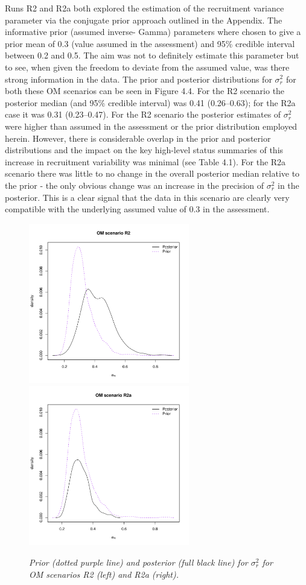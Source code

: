 \documentclass[11pt]{article}
\newcommand{\sigr}{\sigma^2_r}
\begin{document}
Runs R2 and R2a both explored the estimation of the recruitment variance parameter via the
conjugate prior approach outlined in the Appendix. The informative prior (assumed inverse-
Gamma) parameters where chosen to give a prior mean of 0.3 (value assumed in the assessment) and 95\% credible interval between 0.2 and 0.5. The aim was not to definitely estimate this parameter but to see, when given the freedom to deviate from the assumed value, was there strong information in the data. The prior and posterior distributions for $\sigr$ for both these OM scenarios can be seen in Figure 4.4. For the R2 scenario the posterior median (and 95\% credible interval) was 0.41 (0.26--0.63); for the R2a case it was 0.31 (0.23--0.47). For the R2 scenario the posterior estimates of $\sigr$ were higher than assumed in the assessment or the prior distribution employed herein. However, there is considerable overlap in the prior and posterior distributions and the impact on the key high-level status summaries of this increase in recruitment variability was minimal (see Table 4.1). For the R2a scenario there was little to no change in the overall posterior median relative to the prior - the only obvious change was an increase in the precision of $\sigr$ in the posterior. This is a clear signal that the data in this scenario are clearly very compatible with the underlying assumed value of 0.3 in the assessment.

\begin{figure}[hb]
    \begin{center}
       \includegraphics[width=7cm,height=7cm]{figs/pvsp_sigmar_R2.pdf}\includegraphics[width=7cm,height=7cm]{figs/pvsp_sigmar_R2a.pdf} 
    \end{center}
    \caption{\textit{Prior (dotted purple line) and posterior (full black line) for $\sigr$ for OM scenarios R2 (left) and R2a (right).}}
\end{figure}
\end{document}
